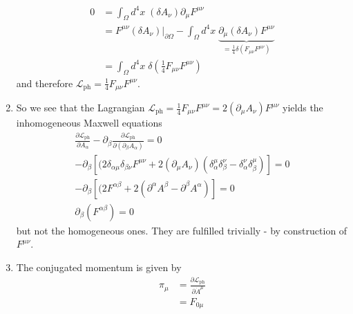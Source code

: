 \documentclass[10pt,a4paper]{article}
\theoremstyle{definition}
\begin{document}
\begin{enumerate}
    \begin{align}
        0
        &=\int_\Omega d^4x\;(\delta A_\nu) \partial_\mu F^{\mu\nu}\\
        &=F^{\mu\nu}(\delta A_\nu)|_{\partial\Omega}-\int_\Omega d^4x\;\underbrace{\partial_\mu(\delta A_\nu)F^{\mu\nu}}_{=\frac{1}{4}\delta(F_{\mu\nu}F^{\mu\nu})}\\
        &=\int_{\Omega}d^4x\;\delta\left(\frac{1}{4}F_{\mu\nu}F^{\mu\nu}\right)
    \end{align}
    and therefore $\mathscr{L}_\text{ph}=\frac{1}{4}F_{\mu\nu}F^{\mu\nu}$.
    \item So we see that the Lagrangian $\mathscr{L}_\text{ph}=\frac{1}{4}F_{\mu\nu}F^{\mu\nu}=2(\partial_\mu A_\nu)F^{\mu\nu}$ yields the inhomogeneous Maxwell equations 
    \begin{align}
        \frac{\partial\mathscr{L}_\text{ph}}{\partial A_\alpha}-\partial_\beta\frac{\partial\mathscr{L}_\text{ph}}{\partial(\partial_\beta A_\alpha)}=0\\
        -\partial_\beta\left[(2\delta_{\alpha\mu}\delta_{\beta\nu}F^{\mu\nu}+2(\partial_\mu A_\nu)(\delta_\alpha^\mu\delta_\beta^\nu-\delta_\alpha^\nu\delta_\beta^\mu)\right]=0\\
        -\partial_\beta\left[(2F^{\alpha\beta}+2(\partial^\alpha A^\beta-\partial^\beta A^\alpha)\right]=0\\
        \partial_\beta(F^{\alpha\beta})=0
    \end{align}
    but not the homogeneous ones. They are fulfilled trivially - by construction of $F^{\mu\nu}$.
    \item The conjugated momentum is given by
    \begin{align}
        \pi_\mu
        &=\frac{\partial\mathscr{L}_\text{ph}}{\partial \dot{A}^\mu}\\
        &= F_{0\mu}
    \end{align}
\end{enumerate}
\end{document}
